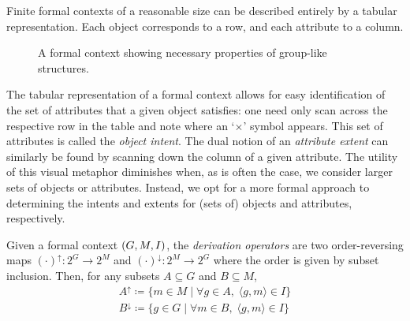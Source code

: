 \begin{example}
  \label{example:first-example-formal-context}
  Finite formal contexts of a reasonable size can be described entirely by a tabular representation. Each object corresponds to a row, and each attribute to a column.

  \begin{figure}[H]
    \centering
    \begin{cxt}
          
    \end{cxt}
    \caption{A formal context showing necessary properties of group-like structures.}
    \label{context:formal-context-group-structures}
  \end{figure}
\end{example}

The tabular representation of a formal context allows for easy identification of the set of attributes that a given object satisfies: one need only scan across the respective row in the table and note where an `$\times$' symbol appears. This set of attributes is called the \textit{object intent}. The dual notion of an \textit{attribute extent} can similarly be found by scanning down the column of a given attribute. The utility of this visual metaphor diminishes when, as is often the case, we consider larger sets of objects or attributes. Instead, we opt for a more formal approach to determining the intents and extents for (sets of) objects and attributes, respectively.  

\begin{definition}
  \label{definition:derivation-operators}
  Given a formal context $(G,M,I)$, the \textit{derivation operators} are two order-reversing maps $(\cdot)^\uparrow : 2^G \to 2^M$ and $(\cdot)^\downarrow : 2^M \to 2^G$ where the order is given by subset inclusion. Then, for any subsets $A \subseteq G$ and $B \subseteq M$,
  \begin{align*}
    A^\uparrow \coloneqq \{m \in M \mid \forall g \in A, \; \langle g,m \rangle \in I\} \\
    B^\downarrow \coloneqq \{g \in G \mid \forall m \in B, \; \langle g,m \rangle \in I\}
  \end{align*}
\end{definition}

